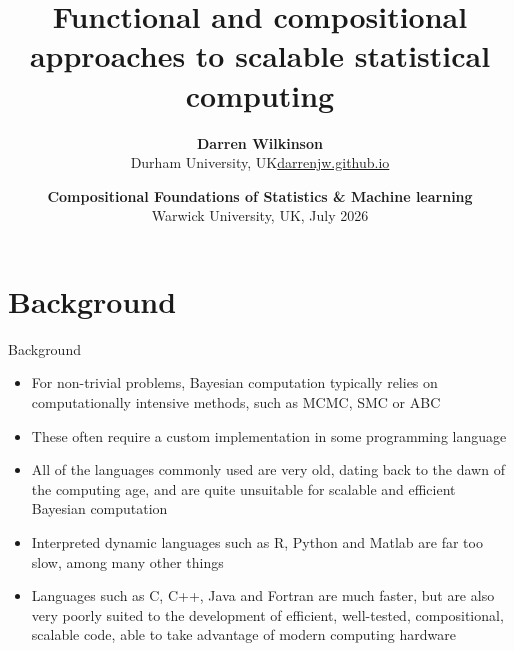 \documentclass[mathserif,handout]{beamer}
\begin{document}
\title{Functional and compositional approaches to scalable statistical computing}
\author{\textbf{\large Darren Wilkinson} \\
Durham University, UK\hfill\alert{\url{darrenjw.github.io}}\\
}
\date{\textbf{Compositional Foundations of Statistics \& Machine learning}\\Warwick University, UK, July 2026}
  
\frame{\titlepage}




\section{Background}

\begin{frame}{Background}
\protect\hypertarget{background}{}

\begin{itemize}

\item
  For non-trivial problems, Bayesian computation typically relies on
  computationally intensive methods, such as MCMC, SMC or ABC
\item
  These often require a custom implementation in some programming
  language
\item
  All of the languages commonly used are very old, dating back to the
  dawn of the computing age, and are quite unsuitable for scalable and
  efficient Bayesian computation
\item
  Interpreted dynamic languages such as R, Python and Matlab are far too
  slow, among many other things
\item
  Languages such as C, C++, Java and Fortran are much faster, but are
  also very poorly suited to the development of efficient, well-tested, compositional,
  scalable code, able to take advantage of modern computing hardware
\end{itemize}

\end{frame}
\end{document}
